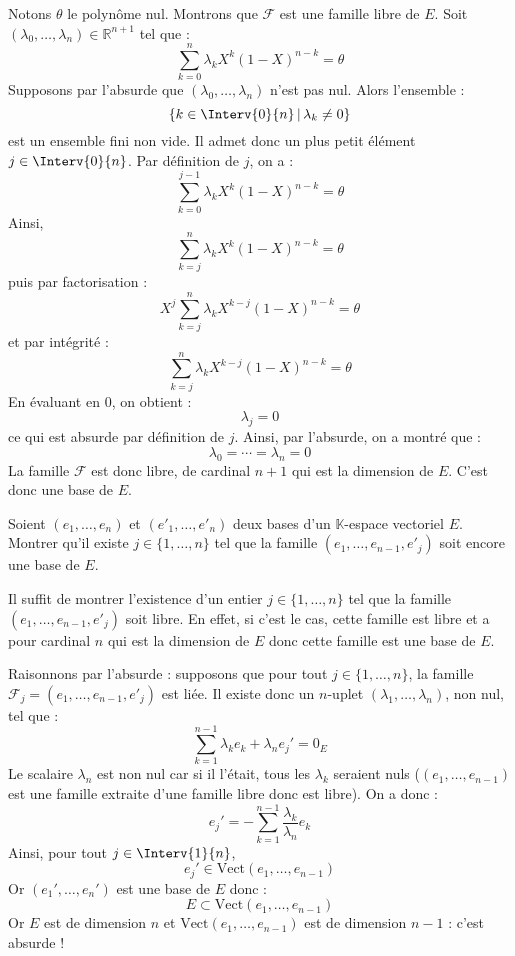 \documentclass[a4paper,10pt]{report}
\begin{document}
\corr Notons $\theta$ le polynôme nul. Montrons que $\mathcal{F}$ est une famille libre de $E$. Soit $(\lambda_0, \ldots, \lambda_n) \in \mathbb{R}^{n+1}$ tel que :
$$ \sum_{k=0}^n \lambda_k X^k (1-X)^{n-k} = \theta$$
Supposons par l'absurde que $(\lambda_0, \ldots, \lambda_n)$ n'est pas nul. Alors l'ensemble :
$$ \lbrace k \in \Interv{0}{n} \, \vert \, \lambda_k \neq 0 \rbrace$$
est un ensemble fini non vide. Il admet donc un plus petit élément $j \in \Interv{0}{n}$. Par définition de $j$, on a :
$$ \sum_{k=0}^{j-1} \lambda_k X^k (1-X)^{n-k} = \theta$$
Ainsi,
$$ \sum_{k=j}^n \lambda_k X^k (1-X)^{n-k} = \theta$$
puis par factorisation :
$$ X^j \sum_{k=j}^n \lambda_k X^{k-j} (1-X)^{n-k} = \theta$$
et par intégrité :
$$ \sum_{k=j}^n \lambda_k X^{k-j} (1-X)^{n-k} = \theta$$
En évaluant en $0$, on obtient :
$$ \lambda_j = 0$$
ce qui est absurde par définition de $j$. Ainsi, par l'absurde, on a montré que :
$$ \lambda_0 = \cdots = \lambda_n = 0$$
La famille $\mathcal{F}$ est donc libre, de cardinal $n+1$ qui est la dimension de $E$. C'est donc une base de $E$.

\begin{Exercice}{} Soient $(e_1 , \ldots ,e_n)$ et $(e'_1 , \ldots ,e'_n)$ deux bases d'un $\mathbb{K}$-espace vectoriel $E$. Montrer qu'il existe $j \in \lbrace 1, \ldots ,n \rbrace$ tel que la famille $(e_1 , \ldots ,e_{n - 1} ,e'_j)$ soit encore une base de $E$.
\end{Exercice}

\corr Il suffit de montrer l'existence d'un entier $j \in \lbrace 1, \ldots ,n \rbrace$ tel que la famille $(e_1 , \ldots ,e_{n - 1} ,e'_j)$ soit libre. En effet, si c'est le cas, cette famille est libre et a pour cardinal $n$ qui est la dimension de $E$ donc cette famille est une base de $E$.

\medskip

\noindent Raisonnons par l'absurde : supposons que pour tout $j \in \lbrace 1, \ldots ,n \rbrace$, la famille $\mathcal{F}_j=(e_1 , \ldots ,e_{n - 1} ,e'_j)$ est liée. Il existe donc un $n$-uplet $(\lambda_1, \ldots, \lambda_n)$, non nul, tel que :
$$ \sum_{k=1}^{n-1} \lambda_k e_k + \lambda_n e_j' = 0_E$$
Le scalaire $\lambda_n$ est non nul car si il l'était, tous les $\lambda_k$ seraient nuls ($(e_1, \ldots, e_{n-1})$ est une famille extraite d'une famille libre donc est libre). On a donc :
$$ e_j' = - \sum_{k=1}^{n-1} \dfrac{\lambda_k}{\lambda_n} e_k$$
Ainsi, pour tout $j \in \Interv{1}{n}$,
$$ e_j' \in \textrm{Vect}(e_1, \ldots, e_{n-1})$$
Or $(e_1', \ldots, e_n')$ est une base de $E$ donc :
$$ E \subset \textrm{Vect}(e_1, \ldots, e_{n-1})$$
Or $E$ est de dimension $n$ et $\textrm{Vect}(e_1, \ldots, e_{n-1})$ est de dimension $n-1$ : c'est absurde !
\end{document}
